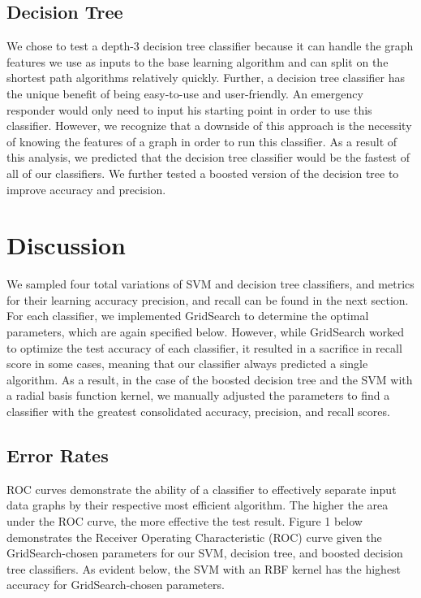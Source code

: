 \documentclass{article}
\begin{document}
\subsection{Decision Tree}

We chose to test a depth-3 decision tree classifier because it can handle the graph features we use as inputs to the base learning algorithm and can split on the shortest path algorithms relatively quickly. Further, a decision tree classifier has the unique benefit of being easy-to-use and user-friendly. An emergency responder would only need to input his starting point in order to use this classifier. However, we recognize that a downside of this approach is the necessity of knowing the features of a graph in order to run this classifier. As a result of this analysis, we predicted that the decision tree classifier would be the fastest of all of our classifiers. We further tested a boosted version of the decision tree to improve accuracy and precision.

\section{Discussion}

We sampled four total variations of SVM and decision tree classifiers, and metrics for their learning accuracy precision, and recall can be found in the next section. For each classifier, we implemented GridSearch to determine the optimal parameters, which are again specified below. However, while GridSearch worked to optimize the test accuracy of each classifier, it resulted in a sacrifice in recall score in some cases, meaning that our classifier always predicted a single algorithm. As a result, in the case of the boosted decision tree and the SVM with a radial basis function kernel, we manually adjusted the parameters to find a classifier with the greatest consolidated accuracy, precision, and recall scores.

\subsection{Error Rates}

ROC curves demonstrate the ability of a classifier to effectively separate input data graphs by their respective most efficient algorithm. The higher the area under the ROC curve, the more effective the test result. Figure 1 below demonstrates the Receiver Operating Characteristic (ROC) curve given the GridSearch-chosen parameters for our SVM, decision tree, and boosted decision tree classifiers. As evident below, the SVM with an RBF kernel has the highest accuracy for GridSearch-chosen parameters.
\end{document}
